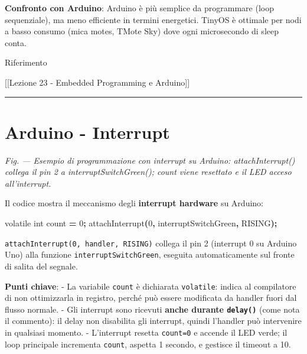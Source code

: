\documentclass[
  italian,
  openany]{book}
\newenvironment{Shaded}{\begin{snugshade}}{\end{snugshade}}
\newcommand{\AttributeTok}[1]{\textcolor[rgb]{0.13,0.29,0.53}{#1}}
\newcommand{\DataTypeTok}[1]{\textcolor[rgb]{0.13,0.29,0.53}{#1}}
\newcommand{\DecValTok}[1]{\textcolor[rgb]{0.00,0.00,0.81}{#1}}
\newcommand{\NormalTok}[1]{#1}
\newcommand{\OperatorTok}[1]{\textcolor[rgb]{0.81,0.36,0.00}{\textbf{#1}}}
\begin{document}
\textbf{Confronto con Arduino}: Arduino è più semplice da programmare
(loop sequenziale), ma meno efficiente in termini energetici. TinyOS è
ottimale per nodi a basso consumo (mica motes, TMote Sky) dove ogni
microsecondo di sleep conta.

\begin{calloutnote}{Riferimento}

{[}{[}Lezione 23 - Embedded Programming e Arduino{]}{]}

\end{calloutnote}

\begin{center}\rule{0.5\linewidth}{0.5pt}\end{center}

\section{Arduino - Interrupt}\label{arduino---interrupt}

\emph{Fig. --- Esempio di programmazione con interrupt su Arduino:
attachInterrupt() collega il pin 2 a interruptSwitchGreen(); count viene
resettato e il LED acceso all'interrupt.}

Il codice mostra il meccanismo degli \textbf{interrupt hardware} su
Arduino:

\begin{Shaded}
\begin{Highlighting}[]
\AttributeTok{volatile} \DataTypeTok{int}\NormalTok{ count }\OperatorTok{=} \DecValTok{0}\OperatorTok{;}
\NormalTok{attachInterrupt}\OperatorTok{(}\DecValTok{0}\OperatorTok{,}\NormalTok{ interruptSwitchGreen}\OperatorTok{,}\NormalTok{ RISING}\OperatorTok{);}
\end{Highlighting}
\end{Shaded}

\texttt{attachInterrupt(0,\ handler,\ RISING)} collega il pin 2
(interrupt 0 su Arduino Uno) alla funzione
\texttt{interruptSwitchGreen}, eseguita automaticamente sul fronte di
salita del segnale.

\textbf{Punti chiave}: - La variabile \texttt{count} è dichiarata
\texttt{volatile}: indica al compilatore di non ottimizzarla in
registro, perché può essere modificata da handler fuori dal flusso
normale. - Gli interrupt sono ricevuti \textbf{anche durante
\texttt{delay()}} (come nota il commento): il delay non disabilita gli
interrupt, quindi l'handler può intervenire in qualsiasi momento. -
L'interrupt resetta \texttt{count=0} e accende il LED verde; il loop
principale incrementa \texttt{count}, aspetta 1 secondo, e gestisce il
timeout a 10.
\end{document}

